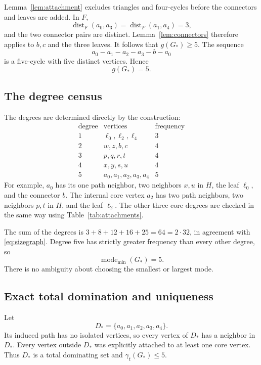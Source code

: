 \documentclass[11pt,a4paper]{article}
\theoremstyle{definition}
\theoremstyle{remark}
\DeclareMathOperator{\dist}{dist}
\newcommand{\gt}{\gamma_t}
\newcommand{\mmin}{\operatorname{mode}_{\min}}
\newcommand{\Gstar}{G_{\ast}}
\newcommand{\core}{D_{\ast}}
\begin{document}
Lemma~\ref{lem:attachment} excludes triangles and four-cycles before
the connectors and leaves are added. In $F$,
\[
           \dist_F(a_0,a_3)=\dist_F(a_1,a_4)=3,
\]
and the two connector pairs are distinct. Lemma~\ref{lem:connectors}
therefore applies to $b,c$ and the three leaves.
It follows that $g(\Gstar)\ge5$.
The sequence
\[
                    a_0-a_1-a_2-a_3-b-a_0
\]
is a five-cycle with five distinct vertices. Hence
\begin{equation}\label{eq:girth}
                          g(\Gstar)=5.
\end{equation}

\subsection{The degree census}

The degrees are determined directly by the construction:
\[
\begin{array}{c|l|c}
\text{degree}&\text{vertices}&\text{frequency}\\ \hline
1&\ell_0,\ell_2,\ell_4&3\\
2&w,z,b,c&4\\
3&p,q,r,t&4\\
4&x,y,s,u&4\\
5&a_0,a_1,a_2,a_3,a_4&5
\end{array}
\]
For example, $a_0$ has its one path neighbor, two neighbors
$x,u$ in $H$, the leaf $\ell_0$, and the connector $b$.
The internal core vertex $a_2$ has two path neighbors,
two neighbors $p,t$ in $H$, and the leaf $\ell_2$.
The other three core degrees are checked in the same way using
Table~\ref{tab:attachments}.

The sum of the degrees is
$3+8+12+16+25=64=2\cdot32$, in agreement with
\eqref{eq:sizegraph}. Degree five has strictly greater frequency
than every other degree, so
\begin{equation}\label{eq:mode}
                        \mmin(\Gstar)=5.
\end{equation}
There is no ambiguity about choosing the smallest or largest mode.

\subsection{Exact total domination and uniqueness}

Let
\[
                       \core=\{a_0,a_1,a_2,a_3,a_4\}.
\]
Its induced path has no isolated vertices, so every vertex of
$\core$ has a neighbor in $\core$. Every vertex outside $\core$
was explicitly attached to at least one core vertex.
Thus $\core$ is a total dominating set and $\gt(\Gstar)\le5$.
\end{document}
